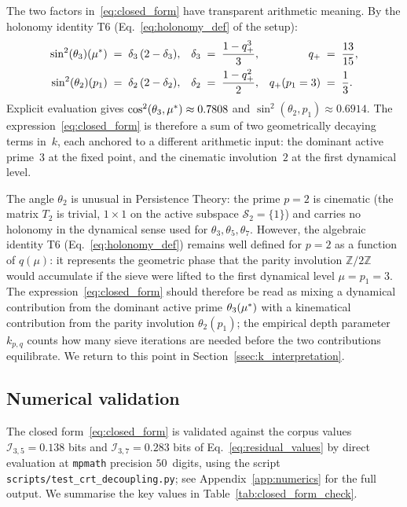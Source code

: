 The two factors in~\eqref{eq:closed_form} have transparent
arithmetic meaning. By the holonomy identity T6
(Eq.~\eqref{eq:holonomy_def} of the setup):
\begin{align}
  \sin^2(\theta_{3})({\mu^{*}}) &\;=\; \delta_3\,(2 - \delta_3),
  &
  \delta_3 &\;=\; \frac{1 - q_{+}^{3}}{3},
  &
  q_{+} &\;=\; \frac{13}{15},
  \label{eq:theta3_explicit}
\\
  \sin^2(\theta_{2})(p_1) &\;=\; \delta_2\,(2 - \delta_2),
  &
  \delta_2 &\;=\; \frac{1 - q_{+}^{2}}{2},
  &
  q_{+}(p_1=3) &\;=\; \frac{1}{3}.
  \label{eq:theta2_explicit}
\end{align}
Explicit evaluation gives $\cos^2(\theta_3, {\mu^{*}}) \approx 0.7808$
and $\sin^2(\theta_2, p_1) \approx 0.6914$. The
expression~\eqref{eq:closed_form} is therefore a sum of two
geometrically decaying terms in~$k$, each anchored to a different
arithmetic input: the dominant active prime~$3$ at the fixed point,
and the cinematic involution~$2$ at the first dynamical level.

\begin{remark}
\label{rmk:theta2_role}
The angle $\theta_2$ is unusual in Persistence Theory: the prime
$p = 2$ is cinematic (the matrix $T_2$ is trivial, $1\times 1$ on
the active subspace $\mathcal{S}_2 = \{1\}$) and carries no
holonomy in the dynamical sense used for $\theta_3, \theta_5,
\theta_7$. However, the algebraic identity T6 (Eq.~\eqref{eq:holonomy_def})
remains well defined for $p = 2$ as a function of $q(\mu)$: it
represents the geometric phase that the parity involution
$\mathbb{Z}/2\mathbb{Z}$ would accumulate if the sieve were lifted to
the first dynamical level $\mu = p_1 = 3$. The
expression~\eqref{eq:closed_form} should therefore be read as
mixing a dynamical contribution from the dominant active prime
$\theta_3({\mu^{*}})$ with a kinematical contribution from the parity
involution $\theta_2(p_1)$; the empirical depth parameter
$k_{p,q}$ counts how many sieve iterations are needed before the
two contributions equilibrate. We return to this point in
Section~\ref{ssec:k_interpretation}.
\end{remark}

\subsection{Numerical validation}
\label{ssec:t1_validation}

The closed form~\eqref{eq:closed_form} is validated against the
corpus values $\mathcal{I}_{3,5} = 0.138$ bits and
$\mathcal{I}_{3,7} = 0.283$ bits of
Eq.~\eqref{eq:residual_values} by direct evaluation at
\texttt{mpmath} precision $50$~digits, using the
script \texttt{scripts/test\_crt\_decoupling.py}; see
Appendix~\ref{app:numerics} for the full output. We summarise the
key values in Table~\ref{tab:closed_form_check}.

